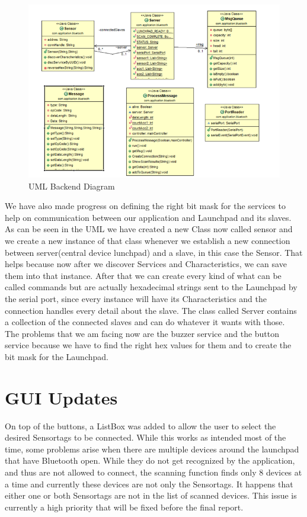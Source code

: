 \documentclass[12pt]{article}
\begin{document}
\FloatBarrier
\begin{figure}[h]
	\centering
	\includegraphics[scale=0.72]{images/UML_1.png}
	\caption{UML Backend Diagram}
	\label{img:UML_1}
\end{figure}
\FloatBarrier

We have also made progress on defining the right bit mask for the services to help on communication
between our application and Launchpad and its slaves.\\
As can be seen in the UML we have created a new Class now called sensor and we create a new instance of that class whenever we establish a new connection between server(central device lunchpad) and a slave, in this case the Sensor. That helps because now after we discover Services and Characteristics, we can save them into that instance. After that we can create every kind of what can be called commands but are actually hexadecimal strings sent to the Launchpad by the serial port, since every instance will have its Characteristics and the connection handles every detail about the slave. The class called Server contains a collection of the connected slaves and can do whatever it wants with those.\\
The problems that we am facing now are the buzzer service and the button service because we have to find the right hex values for them and to create the bit mask for the Launchpad.

\section{GUI Updates}
On top of the buttons, a ListBox was added to allow the user to select
the desired Sensortags to be connected. While this works as intended most
of the time, some problems arise when there are multiple devices around the
launchpad that have Bluetooth open. While they do not get recognized by
the application, and thus are not allowed to connect, the scanning function
finds only 8 devices at a time and currently these devices are not only the
Sensortags. It happens that either one or both Sensortags are not in the list
of scanned devices. This issue is currently a high priority that will be fixed
before the final report.
\end{document}
